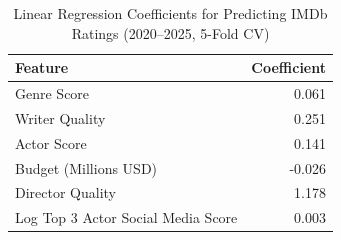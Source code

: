 \begin{table}
\caption{Linear Regression Coefficients for Predicting IMDb Ratings (2020--2025, 5-Fold CV)}
\label{tab:linear_regression_coeffs}
\begin{tabular}{lr}
\toprule
Feature & Coefficient \\
\midrule
Genre Score & 0.061 \\
Writer Quality & 0.251 \\
Actor Score & 0.141 \\
Budget (Millions USD) & -0.026 \\
Director Quality & 1.178 \\
Log Top 3 Actor Social Media Score & 0.003 \\
\bottomrule
\end{tabular}
\end{table}
